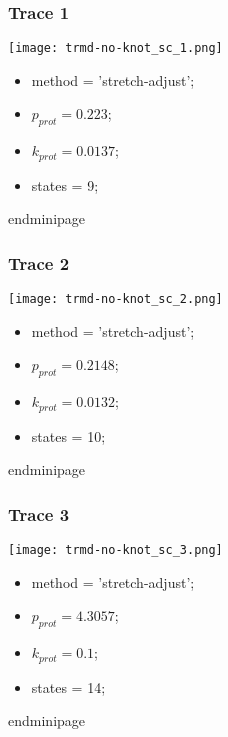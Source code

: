 \begin{minipage}[c]{0.45\textwidth}
\begin{minipage}[c]{0.45\textwidth}
\begin{minipage}[c]{0.45\textwidth}
\begin{minipage}[c]{0.45\textwidth}
\begin{minipage}[c]{0.45\textwidth}
\begin{minipage}[c]{0.45\textwidth}
\begin{minipage}[c]{0.45\textwidth}
\begin{minipage}[c]{0.45\textwidth}
\begin{minipage}[c]{0.45\textwidth}
\begin{minipage}[c]{0.45\textwidth}
\subsubsection{Trace 1}
\begin{minipage}[c]{0.7\textwidth}
    \texttt{[image: trmd-no-knot\_sc\_1.png]}
\end{minipage}
\hfill
\begin{minipage}[c]{0.45\textwidth}
    \begin{itemize}
        \item method = 'stretch-adjust';
        \item $p_{prot}=0.223$;
        \item $k_{prot}=0.0137$;
        \item states = 9;
    \end{itemize}
end{minipage}

\subsubsection{Trace 2}
\begin{minipage}[c]{0.7\textwidth}
    \texttt{[image: trmd-no-knot\_sc\_2.png]}
\end{minipage}
\hfill
\begin{minipage}[c]{0.45\textwidth}
    \begin{itemize}
        \item method = 'stretch-adjust';
        \item $p_{prot}=0.2148$;
        \item $k_{prot}=0.0132$;
        \item states = 10;
    \end{itemize}
end{minipage}

\subsubsection{Trace 3}
\begin{minipage}[c]{0.7\textwidth}
    \texttt{[image: trmd-no-knot\_sc\_3.png]}
\end{minipage}
\hfill
\begin{minipage}[c]{0.45\textwidth}
    \begin{itemize}
        \item method = 'stretch-adjust';
        \item $p_{prot}=4.3057$;
        \item $k_{prot}=0.1$;
        \item states = 14;
    \end{itemize}
end{minipage}


\end{minipage}
\end{minipage}
\end{minipage}
\end{minipage}
\end{minipage}
\end{minipage}
\end{minipage}
\end{minipage}
\end{minipage}
\end{minipage}
\end{minipage}
\end{minipage}
\end{minipage}
